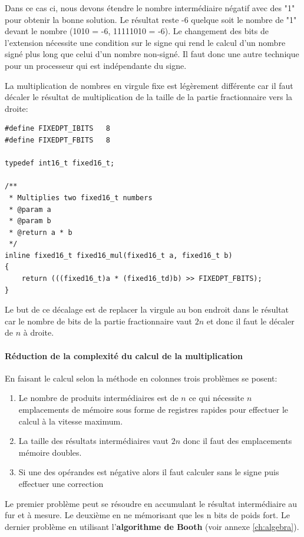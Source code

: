 Dans ce cas ci, nous devons étendre le nombre intermédiaire négatif avec des "1" pour obtenir la bonne solution. Le résultat reste -6 quelque soit le nombre de "1" devant le nombre (1010 = -6, 11111010 = -6). Le changement des bits de l'extension nécessite une condition sur le signe qui rend le calcul d'un nombre signé plus long que celui d'un nombre non-signé. Il faut donc une autre technique pour un processeur qui est indépendante du signe.

La multiplication de nombres en virgule fixe est légèrement différente car il faut décaler le résultat de multiplication de la taille de la partie fractionnaire vers la droite:

\lstset{style=customc}
\begin{lstlisting}
#define FIXEDPT_IBITS	8
#define FIXEDPT_FBITS	8

typedef int16_t fixed16_t;

/**
 * Multiplies two fixed16_t numbers
 * @param a
 * @param b
 * @return a * b
 */
inline fixed16_t fixed16_mul(fixed16_t a, fixed16_t b)
{
	return (((fixed16_t)a * (fixed16_td)b) >> FIXEDPT_FBITS);
}
\end{lstlisting}

Le but de ce décalage est de replacer la virgule au bon endroit dans le résultat car le nombre de bits de la partie fractionnaire vaut $2n$ et donc il faut le décaler de $n$ à droite.

\paragraph{Réduction de la complexité du calcul de la multiplication}
En faisant le calcul selon la méthode en colonnes trois problèmes se posent:
\begin{enumerate}
\item Le nombre de produits intermédiaires est de $n$ ce qui nécessite $n$ emplacements de mémoire sous forme de registres rapides pour effectuer le calcul à la vitesse maximum. 
\item La taille des résultats intermédiaires vaut $2n$ donc il faut des emplacements mémoire doubles.
\item Si une des opérandes est négative alors il faut calculer sans le signe puis effectuer une correction
\end{enumerate}
Le premier problème peut se résoudre en accumulant le résultat intermédiaire au fur et à mesure. Le deuxième en ne mémorisant que les n bits de poids fort. Le dernier problème en utilisant l'\textbf{algorithme de Booth} (voir annexe \ref{ch:algebra}). 

